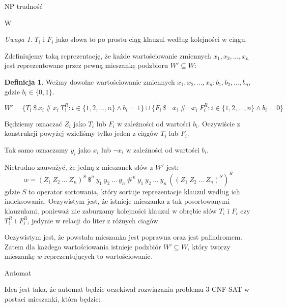 \documentclass{article}
\theoremstyle{definition}
\newtheorem{definition}{Definicja}[section]
\theoremstyle{remark}
\newtheorem{remark}{Uwaga}[section]
\begin{document}
\begin{section}{NP trudność}
\begin{subsection}{W}
     \begin{remark}
         $T_i$ i $F_i$ jako słowa to po prostu ciąg klauzul według kolejności w ciągu.
     \end{remark}

     Zdefiniujemy taką reprezentację, że każde wartościowanie zmiennych $x_1, x_2,
         \ldots, x_n$ jest reprezentowane przez pewną mieszankę podzbioru $W' \subseteq
         W$:
     \begin{definition}
         Weźmy dowolne wartościowanie zmiennych $x_1, x_2, \ldots, x_n: b_1, b_2, \ldots, b_n$, gdzie $b_i \in \{0, 1\}$.

         $ W' = \{ T_i \ \$ \ x_i \ \# \ x_i \ T_i^R: i \in \{1, 2, \ldots, n\} \land b_i = 1 \} \cup \{ F_i \ \$ \ \neg x_i \ \# \ \neg x_i \ F_i^R: i \in \{1, 2, \ldots, n\} \land b_i = 0 \}$

         Będziemy oznaczać $Z_i$ jako $T_i$ lub $F_i$ w zależności od wartości $b_i$.
         Oczywiście z konstrukcji powyżej wzieliśmy tylko jeden z ciągów $T_i$ lub
         $F_i$.

         Tak samo oznaczamy $y_i$ jako $x_i$ lub $\neg x_i$ w zależności od wartości
         $b_i$.

         Nietrudno zauważyć, że jedną z mieszanek słów z $W'$ jest:
         \[ w = (Z_1 \ Z_2 \ \ldots \ Z_n)^S \ \$^n \ y_1 \ y_2 \ \ldots \ y_n \ \#^n \ y_1 \ y_2 \ \ldots \ y_n \ ((Z_1 \ Z_2 \ \ldots \ Z_n)^S)^R \]
         gdzie $S$ to operator sortowania, który sortuje reprezentacje klauzul według
         ich indeksowania. Oczywistym jest, że istnieje mieszanka z tak posortowanymi
         klauzulami, ponieważ nie zaburzamy kolejności klauzul w obrębie słów $T_i$ i
         $F_i$ czy $T_i^R$ i $F_i^R$, jedynie w relacji do liter z różnych ciagów.

         Oczywistym jest, że powstała mieszanka jest poprawna oraz jest palindromem.
         Zatem dla każdego wartościowania istnieje podzbiór $W' \subseteq W$, który
         tworzy mieszankę $w$ reprezentujących to wartościowanie.

     \end{definition}
 \end{subsection}

 \begin{subsection}{Automat}

     Idea jest taka, że automat będzie oczekiwał rozwiązania problemu 3-CNF-SAT w
     postaci mieszanki, która będzie:

     \begin{itemize}


\end{itemize}
\end{subsection}
\end{section}
\end{document}
